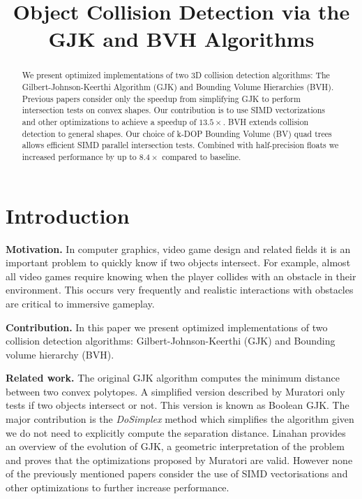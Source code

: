\documentclass[twocolumn]{article}
\title{Object Collision Detection via the GJK and BVH Algorithms}
\newcommand{\mypar}[1]{{\bf #1.}}
\begin{document}
%
\maketitle
%

\begin{abstract} We present optimized implementations of two $3$D collision detection algorithms:  The Gilbert-Johnson-Keerthi Algorithm (GJK) and Bounding Volume Hierarchies (BVH). Previous papers consider only the speedup from simplifying GJK to perform intersection tests on convex shapes. Our contribution is to use SIMD vectorizations and other optimizations to achieve a speedup of $13.5\times$. BVH extends collision detection to general shapes. Our choice of k-DOP Bounding Volume (BV) quad trees allows efficient SIMD parallel intersection tests. Combined with half-precision floats we increased performance by up to $8.4\times$ compared to baseline.

\end{abstract}

\section{Introduction}\label{sec:intro}

\mypar{Motivation} In computer graphics, video game design and related fields it is an important problem to quickly know if two objects intersect. For example, almost all video games require knowing when the player collides with an obstacle in their environment. This occurs very frequently and realistic interactions with obstacles are critical to immersive gameplay. 

\mypar{Contribution}
In this paper we present optimized implementations of two collision detection algorithms: Gilbert-Johnson-Keerthi (GJK) and Bounding volume hierarchy (BVH).

\mypar{Related work} 
The original GJK algorithm \cite{original_gjk} computes the minimum distance between two convex polytopes. A simplified version described by Muratori \cite{muratori} only tests if two objects intersect or not. This version is known as Boolean GJK. The major contribution is the \emph{DoSimplex} method which simplifies the algorithm given we do not need to explicitly compute the separation distance. Linahan \cite{gjk} provides an overview of the evolution of GJK, a geometric interpretation of the problem and proves that the optimizations proposed by Muratori are valid. However none of the previously mentioned papers consider the use of SIMD vectorisations and other optimizations to further increase performance.
\end{document}
